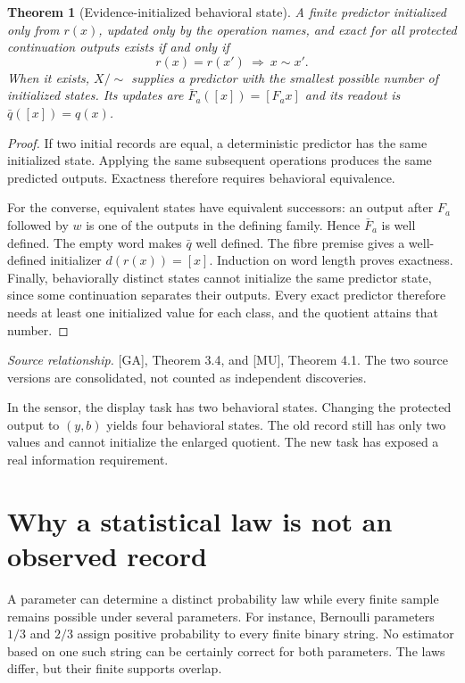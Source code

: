 \documentclass[11pt,oneside,openany]{book}
\newtheorem{theorem}{Theorem}[chapter]
\theoremstyle{definition}\newtheorem{definition}[theorem]{Definition}
\newcommand{\source}[1]{\par{\small\textit{Source relationship.} #1}\par}
\begin{document}
\begin{theorem}[Evidence-initialized behavioral state]\label{r:behavior}
A finite predictor initialized only from $r(x)$, updated only by the operation names, and exact for all protected continuation outputs exists if and only if
\[
r(x)=r(x')\ \Longrightarrow\ x\sim x'.
\]
When it exists, $X/{\sim}$ supplies a predictor with the smallest possible number of initialized states. Its updates are $\bar F_a([x])=[F_ax]$ and its readout is $\bar q([x])=q(x)$.
\end{theorem}
\begin{proof}
If two initial records are equal, a deterministic predictor has the same initialized state. Applying the same subsequent operations produces the same predicted outputs. Exactness therefore requires behavioral equivalence.

For the converse, equivalent states have equivalent successors: an output after $F_a$ followed by $w$ is one of the outputs in the defining family. Hence $\bar F_a$ is well defined. The empty word makes $\bar q$ well defined. The fibre premise gives a well-defined initializer $d(r(x))=[x]$. Induction on word length proves exactness. Finally, behaviorally distinct states cannot initialize the same predictor state, since some continuation separates their outputs. Every exact predictor therefore needs at least one initialized value for each class, and the quotient attains that number.
\end{proof}
\source{[GA], Theorem 3.4, and [MU], Theorem 4.1. The two source versions are consolidated, not counted as independent discoveries.}

In the sensor, the display task has two behavioral states. Changing the protected output to $(y,b)$ yields four behavioral states. The old record still has only two values and cannot initialize the enlarged quotient. The new task has exposed a real information requirement.

\section{Why a statistical law is not an observed record}
A parameter can determine a distinct probability law while every finite sample remains possible under several parameters. For instance, Bernoulli parameters $1/3$ and $2/3$ assign positive probability to every finite binary string. No estimator based on one such string can be certainly correct for both parameters. The laws differ, but their finite supports overlap.
\end{document}
